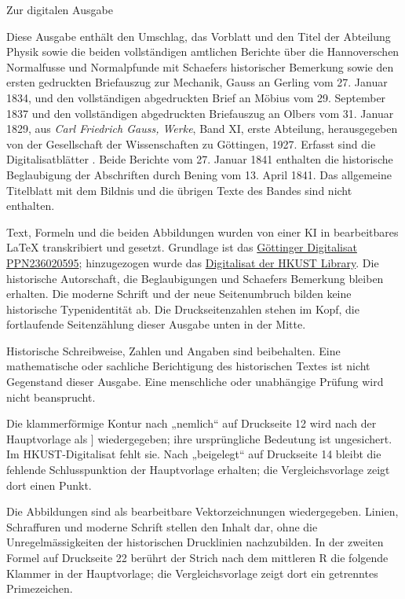\clearpage\NoSourceHead
\begin{center}\large Zur digitalen Ausgabe\end{center}
Diese Ausgabe enthält den Umschlag, das Vorblatt und den Titel der Abteilung Physik sowie die beiden vollständigen amtlichen Berichte über die Hannoverschen Normalfusse und Normalpfunde mit Schaefers historischer Bemerkung sowie den ersten gedruckten Briefauszug zur Mechanik, Gauss an Gerling vom 27. Januar 1834, und den vollständigen abgedruckten Brief an Möbius vom 29. September 1837 und den vollständigen abgedruckten Briefauszug an Olbers vom 31. Januar 1829, aus \textit{Carl Friedrich Gauss, Werke}, Band XI, erste Abteilung, herausgegeben von der Gesellschaft der Wissenschaften zu Göttingen, 1927. Erfasst sind die Digitalisatblätter \SourceScope. Beide Berichte vom 27. Januar 1841 enthalten die historische Beglaubigung der Abschriften durch Bening vom 13. April 1841. Das allgemeine Titelblatt mit dem Bildnis und die übrigen Texte des Bandes sind nicht enthalten.

Text, Formeln und die beiden Abbildungen wurden von einer KI in bearbeitbares LaTeX transkribiert und gesetzt. Grundlage ist das \href{https://gdz.sub.uni-goettingen.de/id/PPN236020595}{Göttinger Digitalisat PPN236020595}; hinzugezogen wurde das \href{https://lbezone.hkust.edu.hk/obj/4/o/b761099/v11,1/pg00011.jpg}{Digitalisat der HKUST Library}. Die historische Autorschaft, die Beglaubigungen und Schaefers Bemerkung bleiben erhalten. Die moderne Schrift und der neue Seitenumbruch bilden keine historische Typenidentität ab. Die Druckseitenzahlen stehen im Kopf, die fortlaufende Seitenzählung dieser Ausgabe unten in der Mitte.

Historische Schreibweise, Zahlen und Angaben sind beibehalten. Eine mathematische oder sachliche Berichtigung des historischen Textes ist nicht Gegenstand dieser Ausgabe. Eine menschliche oder unabhängige Prüfung wird nicht beansprucht.

Die klammerförmige Kontur nach „nemlich“ auf Druckseite 12 wird nach der Hauptvorlage als ] wiedergegeben; ihre ursprüngliche Bedeutung ist ungesichert. Im HKUST-Digitalisat fehlt sie. Nach „beigelegt“ auf Druckseite 14 bleibt die fehlende Schlusspunktion der Hauptvorlage erhalten; die Vergleichsvorlage zeigt dort einen Punkt.

Die Abbildungen sind als bearbeitbare Vektorzeichnungen wiedergegeben. Linien, Schraffuren und moderne Schrift stellen den Inhalt dar, ohne die Unregelmässigkeiten der historischen Drucklinien nachzubilden. In der zweiten Formel auf Druckseite 22 berührt der Strich nach dem mittleren R die folgende Klammer in der Hauptvorlage; die Vergleichsvorlage zeigt dort ein getrenntes Primezeichen.
